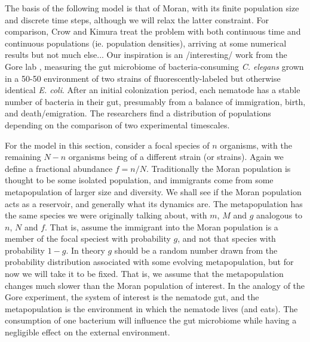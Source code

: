 The basis of the following model is that of Moran, with its finite population size and discrete time steps, although we will relax the latter constraint. 
For comparison, Crow and Kimura \cite{Crow1956,Kimura1983} treat the problem with both continuous time and continuous populations (ie. population densities), arriving at some numerical results but not much else...
Our inspiration is an /interesting/ work from the Gore lab \cite{Vega2017}, measuring the gut microbiome of bacteria-consuming \emph{C. elegans} grown in a 50-50 environment of two strains of fluorescently-labeled but otherwise identical \emph{E. coli}. 
After an initial colonization period, each nematode has a stable number of bacteria in their gut, presumably from a balance of immigration, birth, and death/emigration. 
The researchers find a distribution of populations depending on the comparison of two experimental timescales. 

For the model in this section, consider a focal species of $n$ organisms, with the remaining $N-n$ organisms being of a different strain (or strains). 
Again we define a fractional abundance $f=n/N$. 
Traditionally the Moran population is thought to be some isolated population, and immigrants come from some metapopulation of larger size and diversity. 
We shall see if the Moran population acts as a reservoir, and generally what its dynamics are. 
The metapopulation has the same species we were originally talking about, with $m$, $M$ and $g$ analogous to $n$, $N$ and $f$. 
That is, assume the immigrant into the Moran population is a member of the focal speciest with probability $g$, and not that species with probability $1-g$. 
In theory $g$ should be a random number drawn from the probability distribution associated with some evolving metapopulation, but for now we will take it to be fixed. That is, we assume that the metapopulation changes much slower than the Moran population of interest. 
In the analogy of the Gore experiment, the system of interest is the nematode gut, and the metapopulation is the environment in which the nematode lives (and eats). 
The consumption of one bacterium will influence the gut microbiome while having a negligible effect on the external environment. 

